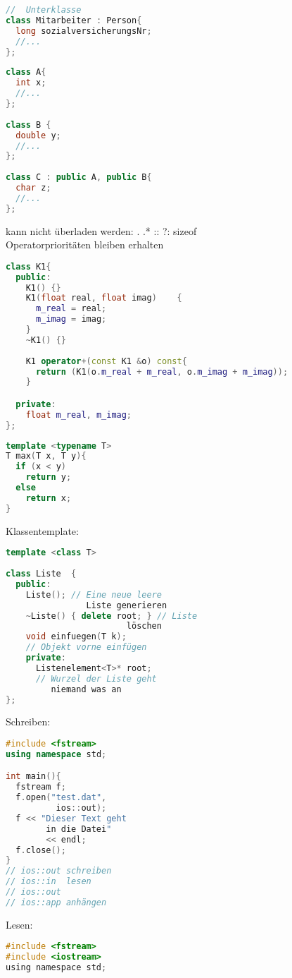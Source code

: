 \begin{multicols*}{3}
\begin{lstlisting}[language=C++]
//	Unterklasse
class Mitarbeiter : Person{
  long sozialversicherungsNr;
  //...
};
\end{lstlisting}
\begin{lstlisting}[language=C++]
class A{
  int x;
  //...
};
 
class B {
  double y;
  //...
};
 
class C : public A, public B{
  char z;
  //...
};
\end{lstlisting}
kann nicht überladen werden: . .* :: ?: sizeof\\
Operatorprioritäten bleiben erhalten
\begin{lstlisting}[language=C++]
class K1{
  public:
    K1() {}
    K1(float real, float imag)    {
      m_real = real;
      m_imag = imag;
    }
    ~K1() {}
 
    K1 operator+(const K1 &o) const{
      return (K1(o.m_real + m_real, o.m_imag + m_imag));
    }

  private:
    float m_real, m_imag;
};
\end{lstlisting}
\begin{lstlisting}[language=C++]
template <typename T>
T max(T x, T y){
  if (x < y)
    return y;
  else
    return x;
}
\end{lstlisting}
Klassentemplate:
\begin{lstlisting}[language=C++]
template <class T>  
 
class Liste  {  
  public:  
    Liste(); // Eine neue leere 
                Liste generieren  
    ~Liste() { delete root; } // Liste 
                        löschen  
    void einfuegen(T k);
    // Objekt vorne einfügen  
    private:  
      Listenelement<T>* root;
      // Wurzel der Liste geht 
         niemand was an   
};
\end{lstlisting}

Schreiben:
\begin{lstlisting}[language=C++]
#include <fstream>
using namespace std;

int main(){
  fstream f;
  f.open("test.dat", 
          ios::out);
  f << "Dieser Text geht 
        in die Datei"
        << endl;
  f.close();
}
// ios::out schreiben
// ios::in  lesen
// ios::out 
// ios::app anhängen
\end{lstlisting}
Lesen:
\begin{lstlisting}[language=C]
#include <fstream>
#include <iostream>
using namespace std;


\end{lstlisting}
\end{multicols*}
